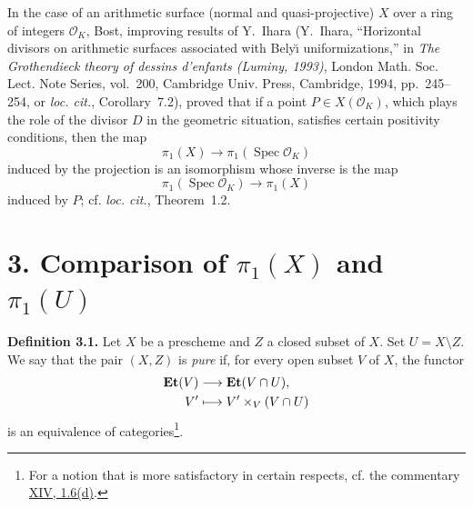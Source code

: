 In the case of an arithmetic surface (normal and quasi-projective) $X$ over a
ring of integers $\mathcal O_K$, Bost, improving results of Y.~Ihara
(Y.~Ihara, ``Horizontal divisors on arithmetic surfaces associated with
Bely\u{\i} uniformizations,'' in \emph{The Grothendieck theory of dessins
d'enfants (Luminy, 1993)}, London Math. Soc. Lect. Note Series, vol.~200,
Cambridge Univ. Press, Cambridge, 1994, pp.~245--254, or \emph{loc. cit.},
Corollary~7.2), proved that if a point
$P\in X(\mathcal O_K)$, which plays the role of the divisor $D$ in the
geometric situation, satisfies certain positivity conditions, then the map
\[
  \pi_1(X)\longrightarrow\pi_1(\operatorname{Spec}\mathcal O_K)
\]
induced by the projection is an isomorphism whose inverse is the map
\[
  \pi_1(\operatorname{Spec}\mathcal O_K)\longrightarrow\pi_1(X)
\]
induced by $P$; cf. \emph{loc. cit.}, Theorem~1.2.

\medskip
{}

\section*{3. Comparison of $\pi_1(X)$ and $\pi_1(U)$}

\medskip
{}\noindent\textbf{Definition 3.1.}\quad
Let $X$ be a prescheme and $Z$ a closed subset of $X$. Set
$U=X\setminus Z$. We say that the pair $(X,Z)$ is \emph{pure} if, for every
open subset $V$ of $X$, the functor
\[
\begin{aligned}
  \mathbf{Et}(V)&\longrightarrow\mathbf{Et}(V\cap U),\\
  V'&\longmapsto V'\times_V(V\cap U)
\end{aligned}
\]
is an equivalence of categories\renewcommand{\thefootnote}{*}\footnote{For a
notion that is more satisfactory in certain respects, cf. the commentary
\hyperref[XIV.1.6]{XIV, 1.6(d)}.}.

\medskip
{}


